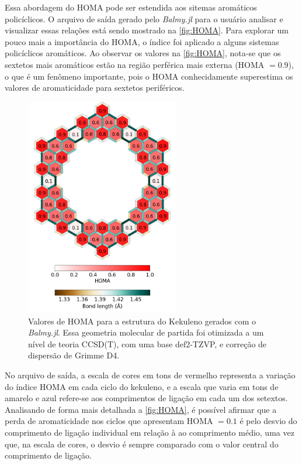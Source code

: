 Essa abordagem do \gls{HOMA} pode ser estendida aos sitemas aromáticos  policíclicos. O arquivo de saída gerado pelo \textit{Balmy.jl} para o usuário analisar e visualizar essas relações está sendo mostrado na \autoref{fig:HOMA}. Para explorar um pouco mais a importância do \gls{HOMA}, o índice foi aplicado a alguns sistemas policíclicos aromáticos. Ao observar os valores na \autoref{fig:HOMA}, nota-se que os sextetos mais aromáticos estão na região perférica mais externa (\gls{HOMA} $= 0.9$), o que é um fenômeno importante, pois o \gls{HOMA} conhecidamente superestima os valores de aromaticidade para sextetos periféricos\autocite{giov2020}. 

\begin{figure}[htb]
\caption{\label{fig:HOMA} Valores de HOMA para a estrutura do Kekuleno gerados com o \textit{Balmy.jl}. Essa geometria molecular de partida foi otimizada a um nível de teoria CCSD(T), com uma base def2-TZVP, e correção de dispersão de Grimme D4.}
	\begin{center}
		\includegraphics[width=0.60\textwidth]{images/geom.png}
	\end{center}
\end{figure}

No arquivo de saída, a escala de cores em tons de vermelho representa a variação do índice \gls{HOMA} em cada ciclo do kekuleno, e a escala que varia em tons de amarelo e azul refere-se aos comprimentos de ligação em cada um dos setextos. Analisando de forma mais detalhada a \autoref{fig:HOMA}, é possível afirmar que a perda de aromaticidade nos ciclos que apresentam \gls{HOMA} $= 0.1$ é pelo desvio do comprimento de ligação individual em relação à ao comprimento médio, uma vez que, na escala de cores, o desvio é sempre comparado com o valor central do comprimento de ligação. 


